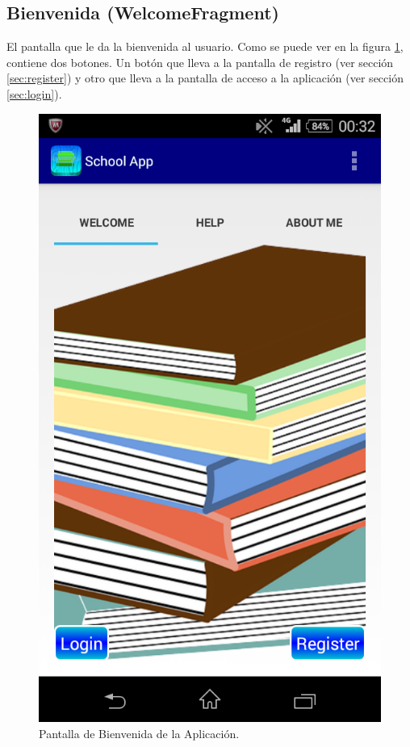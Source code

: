 		\subsection{Bienvenida (WelcomeFragment)} \label{sec:welcome}
			El pantalla que le da la bienvenida al usuario. Como se puede ver en la figura \ref{fig:welcome}, contiene dos botones. Un botón que lleva a la pantalla de registro (ver sección \ref{sec:register}) y otro que lleva a la pantalla de acceso a la aplicación (ver sección \ref{sec:login}).
			
			\begin{figure}[h !]
				\centering
				\includegraphics[scale=0.2]{Imagenes/App/welcome}
				\caption{Pantalla de Bienvenida de la Aplicación.}
				\label{fig:welcome}
			\end{figure}
		
